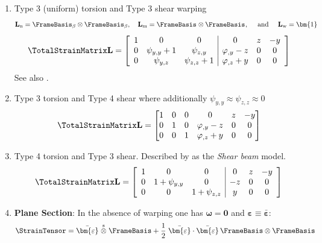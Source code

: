 \begin{enumerate}
\item Type 3 (uniform) torsion and Type 3 shear warping
$$
\mathbf{L}_{\mathrm{n}} = \FrameBasis_{\beta} \otimes \FrameBasis_{\beta}, \quad
\mathbf{L}_{\mathrm{m}} = \FrameBasis_{} \otimes \FrameBasis_{},
\quad\text{ and }\quad
\mathbf{L}_{\mathrm{w}} = \bm{1}
$$
$$
\TotalStrainMatrix\mathbf{L} = \left[\begin{array}{ccc|ccc}
1 & 0 & 0 & 0 & z & - y \\
0 & \psi_{y,y} + 1 & \psi_{z,y} & \varphi_{,y} - z & 0 & 0 \\
0 & \psi_{y,z} & \psi_{z,z} + 1 & \varphi_{,z} + y & 0 & 0
\end{array}\right]
$$
%
See also \cite{wackerfuss2009mixed}.

\item Type 3 torsion and Type 4 shear  \citep{gruttmann1998geometrical,battini2002corotational} where additionally \(\psi_{y,y}  \approx \psi_{z,z} \approx 0\)
$$
\TotalStrainMatrix\mathbf{L} = \left[\begin{matrix}
1 & 0 & 0 & 0 & z & - y \\
0 & 1 & 0 & \varphi_{,y} - z & 0 & 0 \\
0 & 0 & 1 & \varphi_{,z} + y & 0 & 0
\end{matrix}\right]
$$

\item Type 4 torsion and Type 3 shear. Described by \cite{lecorvec2012nonlinear} as the \emph{Shear beam} model.
$$
\TotalStrainMatrix\mathbf{L} = \left[\begin{array}{ccc|ccc}
1 & 0 & 0 & 0 & z & - y \\
0 & 1+\psi_{y,y} & 0 & - z & 0 & 0 \\
0 & 0 & 1+\psi_{z,z} &   y & 0 & 0
\end{array}\right]
$$
\item \textbf{Plane Section}: In the absence of warping one has $\bm{\omega}=\bm{0}$ and $\bm{\varepsilon}\equiv \bar{\bm{\varepsilon}}$:
$$
\StrainTensor = \bar{\bm{\varepsilon}}
\stackrel{\mathrm{s}}{\otimes}
\FrameBasis 
+ \frac{1}{2}\left.
\bar{\bm{\varepsilon}}\cdot\bar{\bm{\varepsilon}}\,\FrameBasis\otimes\FrameBasis\right. \\
$$

\end{enumerate}

